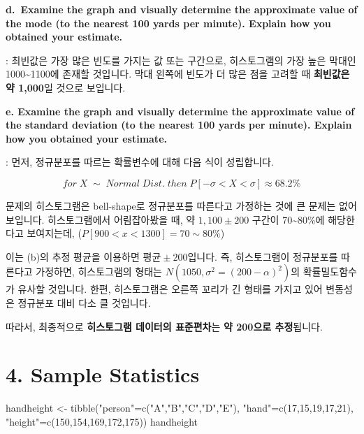 \documentclass[
  letterpaper,
  DIV=11,
  numbers=noendperiod]{scrreprt}
\newenvironment{Shaded}{\begin{snugshade}}{\end{snugshade}}
\newcommand{\DecValTok}[1]{\textcolor[rgb]{0.68,0.00,0.00}{#1}}
\newcommand{\FunctionTok}[1]{\textcolor[rgb]{0.28,0.35,0.67}{#1}}
\newcommand{\NormalTok}[1]{\textcolor[rgb]{0.00,0.23,0.31}{#1}}
\newcommand{\OtherTok}[1]{\textcolor[rgb]{0.00,0.23,0.31}{#1}}
\newcommand{\StringTok}[1]{\textcolor[rgb]{0.13,0.47,0.30}{#1}}
\begin{document}
\textbf{d.~Examine the graph and visually determine the approximate
value of the mode (to the nearest 100 yards per minute). Explain how you
obtained your estimate.}

: 최빈값은 가장 많은 빈도를 가지는 값 또는 구간으로, 히스토그램의 가장
높은 막대인 1000\textasciitilde1100에 존재할 것입니다. 막대 왼쪽에
빈도가 더 많은 점을 고려할 때 \textbf{최빈값은 약 1,000}일 것으로
보입니다.

\textbf{e. Examine the graph and visually determine the approximate
value of the standard deviation (to the nearest 100 yards per minute).
Explain how you obtained your estimate.}

: 먼저, 정규분포를 따르는 확률변수에 대해 다음 식이 성립합니다.

\[for\;X\;\sim\;Normal\;Dist.\;then\;P[-\sigma<X<\sigma]\approx 68.2\%\]

문제의 히스토그램은 bell-shape로 정규분포를 따른다고 가정하는 것에 큰
문제는 없어보입니다. 히스토그램에서 어림잡아봤을 때, 약 \(1,100\pm 200\)
구간이 70\textasciitilde80\%에 해당한다고 보여지는데,
(\(P[900<x<1300]=70\sim80\%\))

이는 (b)의 추정 평균을 이용하면 \(평균\pm 200\)입니다. 즉, 히스토그램이
정규분포를 따른다고 가정하면, 히스토그램의 형태는
\(N(1050,\sigma^2=(200-\alpha)^2)\)의 확률밀도함수가 유사할 것입니다.
한편, 히스토그램은 오른쪽 꼬리가 긴 형태를 가지고 있어 변동성은 정규분포
대비 다소 클 것입니다.

따라서, 최종적으로 \textbf{히스토그램 데이터의 표준편차}는 \textbf{약
200으로 추정}됩니다.

\section*{4. Sample Statistics}\label{sample-statistics}


\begin{Shaded}
\begin{Highlighting}[]
\NormalTok{handheight }\OtherTok{\textless{}{-}} \FunctionTok{tibble}\NormalTok{(}\StringTok{"person"}\OtherTok{=}\FunctionTok{c}\NormalTok{(}\StringTok{"A"}\NormalTok{,}\StringTok{"B"}\NormalTok{,}\StringTok{"C"}\NormalTok{,}\StringTok{"D"}\NormalTok{,}\StringTok{"E"}\NormalTok{),}
                     \StringTok{"hand"}\OtherTok{=}\FunctionTok{c}\NormalTok{(}\DecValTok{17}\NormalTok{,}\DecValTok{15}\NormalTok{,}\DecValTok{19}\NormalTok{,}\DecValTok{17}\NormalTok{,}\DecValTok{21}\NormalTok{),}
                     \StringTok{"height"}\OtherTok{=}\FunctionTok{c}\NormalTok{(}\DecValTok{150}\NormalTok{,}\DecValTok{154}\NormalTok{,}\DecValTok{169}\NormalTok{,}\DecValTok{172}\NormalTok{,}\DecValTok{175}\NormalTok{))}
\NormalTok{handheight}
\end{Highlighting}
\end{Shaded}
\end{document}
